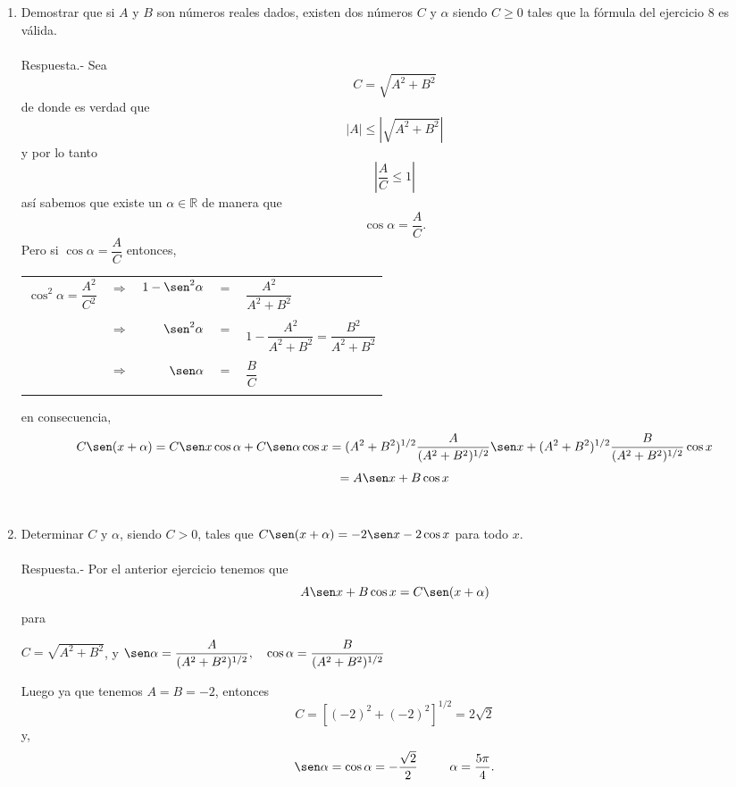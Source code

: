 \begin{enumerate}[\bfseries 1.]
\item Demostrar que si $A$ y $B$ son números reales dados, existen dos números $C$ y $\alpha$ siendo $C\geq 0$ tales que la fórmula del ejercicio 8 es válida.\\\\
    Respuesta.-\; Sea $$C = \sqrt{A^2+B^2}$$
    de donde es verdad que $$|A|\leq \left|\sqrt{A^2+B^2}\right|$$
    y por lo tanto $$\left|\dfrac{A}{C}\leq 1\right|$$
    así sabemos que existe un $\alpha \in \mathbb{R}$ de manera que $$\cos \alpha = \dfrac{A}{C}.$$
    Pero si $\cos \alpha = \dfrac{A}{C}$ entonces,
    \begin{center}
	\begin{tabular}{rcrcl}
	    $\cos^2 \alpha = \dfrac{A^2}{C^2}$&$\Longrightarrow$&$1-\sen^2 \alpha$& $=$ & $\dfrac{A^2}{A^2+B^2}$\\\\
	  &$\Longrightarrow$& $\sen^2 \alpha $ & $=$ & $1-\dfrac{A^2}{A^2 + B^2} = \dfrac{B^2}{A^2+B^2}$\\\\
	  &$\Longrightarrow$& $\sen \alpha$ & $=$ & $\dfrac{B}{C}$\\\\
	\end{tabular}
    \end{center}
    en consecuencia,
    $$C\sen(x+\alpha) = C \sen x \cos \alpha + C \sen \alpha \cos x = (A^2+B^2)^{1/2} \dfrac{A}{(A^2+B^2)^{1/2}} \sen x + (A^2 + B^2)^{1/2} \dfrac{B}{(A^2+B^2)^{1/2}} \cos x  $$
    $$=A\sen x + B\cos x$$\\

\item Determinar $C$ y $ \alpha$, siendo $C>0$, tales que $C \sen (x+\alpha) = -2\sen x-2\cos x$ para todo $x$.\\\\
    Respuesta.-\; Por el anterior ejercicio tenemos que $$A\sen x + B\cos x = C \sen(x+\alpha)$$ para 
    \begin{center}
	$C=\sqrt{A^2+B^2}$, y $\sen \alpha = \dfrac{A}{(A^2+B^2)^{1/2}}, \quad \cos \alpha = \dfrac{B}{(A^2 + B^2)^{1/2}}$
    \end{center}
    Luego ya que tenemos $A=B=-2$, entonces
    $$C=\left[(-2)^2+(-2)^2\right]^{1/2} = 2\sqrt{2}$$
    y,
    $$\sen \alpha = \cos \alpha = -\dfrac{\sqrt{2}}{2} \; \qquad \; \alpha = \dfrac{5\pi}{4}.$$\\


\end{enumerate}
